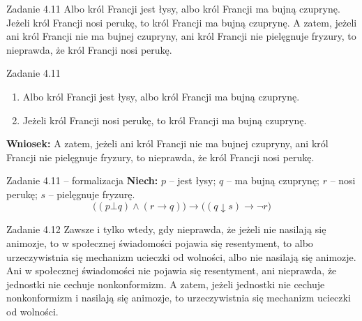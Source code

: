 \documentclass[12pt]{beamer}
\begin{document}
\begin{frame}{Zadanie 4.11}
Albo król Francji jest łysy, albo król Francji ma bujną czuprynę. Jeżeli król Francji nosi perukę, to król Francji ma bujną czuprynę. A zatem, jeżeli ani król Francji nie ma bujnej czupryny, ani król Francji nie pielęgnuje fryzury, to nieprawda, że król Francji nosi perukę.
\end{frame}

\begin{frame}{Zadanie 4.11}
\begin{enumerate}
    \item[P1.] Albo król Francji jest łysy, albo król Francji ma bujną czuprynę.
    \item[P2.] Jeżeli król Francji nosi perukę, to król Francji ma bujną czuprynę.
\end{enumerate}
\vspace{6pt}
\textbf{Wniosek:} A zatem, jeżeli ani król Francji nie ma bujnej czupryny, ani król Francji nie pielęgnuje fryzury, to nieprawda, że król Francji nosi perukę.
\end{frame}

\begin{frame}{Zadanie 4.11 -- formalizacja}
\textbf{Niech:} $p$ -- jest łysy; $q$ -- ma bujną czuprynę; $r$ -- nosi perukę; $s$ -- pielęgnuje fryzurę.
\vspace{10pt}
\[ \big((p \bot q) \wedge (r \rightarrow q)\big) \rightarrow \big((q \downarrow s) \rightarrow \neg r\big) \]
\end{frame}

\begin{frame}{Zadanie 4.12}
\footnotesize
Zawsze i tylko wtedy, gdy nieprawda, że jeżeli nie nasilają się animozje, to w społecznej świadomości pojawia się resentyment, to albo urzeczywistnia się mechanizm ucieczki od wolności, albo nie nasilają się animozje. Ani w społecznej świadomości nie pojawia się resentyment, ani nieprawda, że jednostki nie cechuje nonkonformizm. A zatem, jeżeli jednostki nie cechuje nonkonformizm i nasilają się animozje, to urzeczywistnia się mechanizm ucieczki od wolności.
\end{frame}
\end{document}
